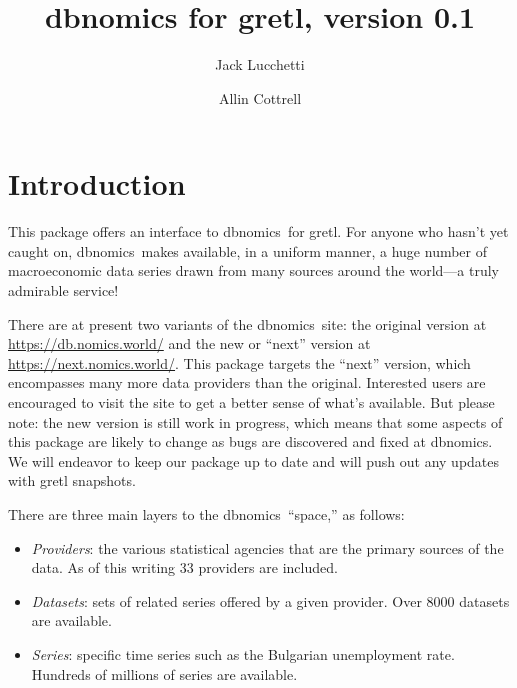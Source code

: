 \documentclass{article}
\begin{document}
\setlength{\parindent}{0pt}
\setlength{\parskip}{1ex}
\setcounter{secnumdepth}{1}


\newenvironment{funcdoc}
{\noindent\hrulefill\\[-10pt]}
{\medskip}

\newcommand{\argname}[1]{\textsl{#1}}
\newcommand{\DB}{\textsf{dbnomics}}
  
\title{dbnomics for gretl, version 0.1}
\author{Jack Lucchetti \and Allin Cottrell}
\maketitle

\section{Introduction}

This package offers an interface to \DB\ for gretl. For
anyone who hasn't yet caught on, \DB\  makes available, in
a uniform manner, a huge number of macroeconomic data series drawn
from many sources around the world---a truly admirable service!

There are at present two variants of the \DB\  site: the
original version at \url{https://db.nomics.world/} and the new or
``next'' version at \url{https://next.nomics.world/}. This package
targets the ``next'' version, which encompasses many more data
providers than the original. Interested users are encouraged to visit
the site to get a better sense of what's available.  But please note:
the new version is still work in progress, which means that some
aspects of this package are likely to change as bugs are discovered
and fixed at \DB. We will endeavor to keep our package
up to date and will push out any updates with gretl snapshots.

There are three main layers to the \DB\ ``space,'' as
follows:
\begin{itemize}
\item \textit{Providers}: the various statistical agencies that are
  the primary sources of the data. As of this writing 33 providers
  are included.
\item \textit{Datasets}: sets of related series offered by a given
  provider. Over 8000 datasets are available.
\item \textit{Series}: specific time series such as the Bulgarian
  unemployment rate. Hundreds of millions of series are available.
\end{itemize}
\end{document}
